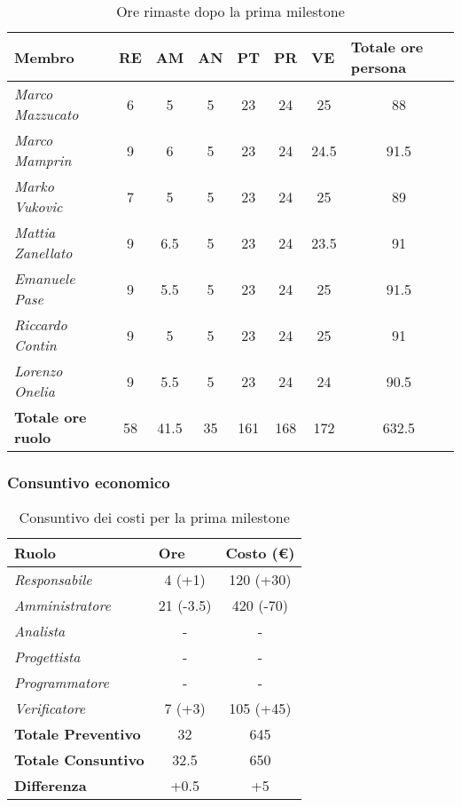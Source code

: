 \begin{table}[!ht]
    \centering
    \begin{tabular}{|l|c|c|c|c|c|c|c|}
    \hline
    \textbf{Membro} & \multicolumn{1}{l|}{\textbf{RE}} & \multicolumn{1}{l|}{\textbf{AM}} & \multicolumn{1}{l|}{\textbf{AN}} & \multicolumn{1}{l|}{\textbf{PT}} & \multicolumn{1}{l|}{\textbf{PR}} & \multicolumn{1}{l|}{\textbf{VE}} & \multicolumn{1}{l|}{\textbf{Totale ore persona}} \\ \hline
    \textit{Marco Mazzucato}  & 6  & 5   & 5  & 23  & 24 & 25   & 88   \\ \hline
    \textit{Marco Mamprin}    & 9  & 6   & 5  & 23  & 24 & 24.5 & 91.5 \\ \hline
    \textit{Marko Vukovic}    & 7  & 5   & 5  & 23  & 24 & 25   & 89   \\ \hline
    \textit{Mattia Zanellato} & 9  & 6.5 & 5  & 23  & 24 & 23.5 & 91   \\ \hline
    \textit{Emanuele Pase}    & 9  & 5.5 & 5  & 23  & 24 & 25   & 91.5 \\ \hline
    \textit{Riccardo Contin}  & 9  & 5   & 5  & 23  & 24 & 25   & 91   \\ \hline
    \textit{Lorenzo Onelia}   & 9  & 5.5 & 5  & 23  & 24 & 24   & 90.5 \\ \hline
    \textbf{Totale ore ruolo} & 58 & 41.5& 35 & 161 & 168& 172  & 632.5\\ \hline
    \end{tabular}
    \caption{Ore rimaste dopo la prima milestone}
\end{table}

\subsubsection{Consuntivo economico}

\begin{table}[!ht]
    \centering
    \begin{tabular}{|l|c|c|}
    \hline
    \textbf{Ruolo} & \multicolumn{1}{l|}{\textbf{Ore}} & \multicolumn{1}{l|}{\textbf{Costo (€)}} \\ \hline
    \textit{Responsabile}      & 4 (+1)    & 120 (+30) \\ \hline
    \textit{Amministratore}    & 21 (-3.5) & 420 (-70) \\ \hline
    \textit{Analista}          & -         & -         \\ \hline
    \textit{Progettista}       & -         & -         \\ \hline
    \textit{Programmatore}     & -         & -         \\ \hline
    \textit{Verificatore}      & 7 (+3)    & 105 (+45) \\ \hline
    \textbf{Totale Preventivo} & 32        & 645       \\ \hline
    \textbf{Totale Consuntivo} & 32.5      & 650       \\ \hline
    \textbf{Differenza}        & +0.5      & +5       \\ \hline
    \end{tabular}
    \caption{Consuntivo dei costi per la prima milestone}
\end{table}

